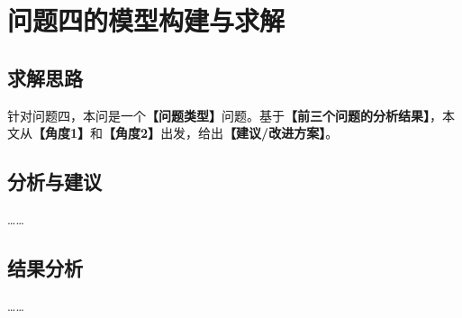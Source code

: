 
\section{问题四的模型构建与求解}

\subsection{求解思路}

针对问题四，本问是一个\textbf{【问题类型】}问题。基于\textbf{【前三个问题的分析结果】}，本文从\textbf{【角度1】}和\textbf{【角度2】}出发，给出\textbf{【建议/改进方案】}。

\subsection{分析与建议}

……

\subsection{结果分析}

……
